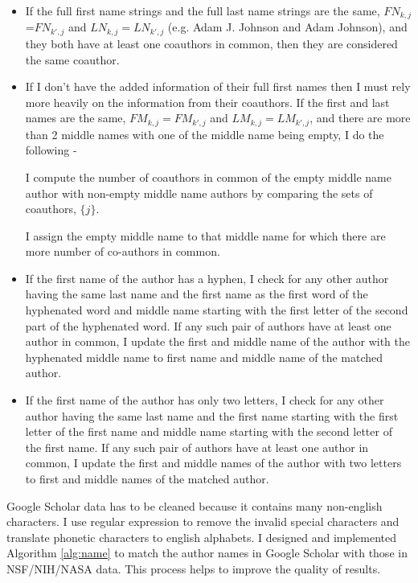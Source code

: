  \begin{itemize}
 \item If the full first name strings and the full last name strings are the same, $FN_{k,j}$=$FN_{k',j}$ and $LN_{k,j} = LN_{k',j}$ (e.g. Adam J. Johnson and Adam Johnson), and they both have at least one coauthors in common,  then they are considered the same coauthor. 
 \item If I don't have the added information of their full first names then I must rely more heavily on the information from their coauthors. If the first and last names are the same, $FM_{k,j}=FM_{k',j}$ and $LM_{k,j}=LM_{k',j}$, and there are more than 2 middle names with one of the middle name being empty, I do the following -
 
 I compute the number of coauthors in common of the empty middle name author with non-empty middle name authors by comparing the sets of coauthors, $\{j\}$.%
 
 I assign the empty middle name to that middle name for which there are more number of co-authors in common.
 
 \item If the first name of the author has a hyphen, I check for any other author having the same last name and the first name as the first word of the hyphenated word and middle name starting with the first letter of the second part of the hyphenated word. If any such pair of authors have at least one author in common, I update the first and middle name of the author with the hyphenated middle name to first name and middle name of the matched author.


\item If the first name of the author has only two letters, I check for any other author having the same last name and the first name starting with the first letter of the first name and middle name starting with the second letter of the first name. If any such pair of authors have at least one author in common, I update the first and middle names of the author with two letters to first and middle names of the matched author.
  
\end{itemize}
Google Scholar data has to be cleaned because it contains many non-english characters. I use regular expression to remove the invalid special characters and translate phonetic characters to english alphabets. I designed and implemented Algorithm \ref{alg:name} to match the author names in Google Scholar with those in NSF/NIH/NASA data. This process helps to improve the quality of results. 


